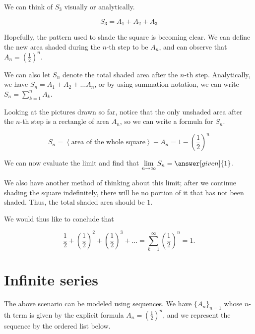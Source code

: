 \documentclass{ximera}
\begin{document}
\begin{example}
We can think of $S_3$ visually or analytically. 

\[
S_3 = A_1 + A_2 + A_3
\]



\vspace{3mm}



Hopefully, the pattern used to shade the square is becoming clear.  We can define the new area shaded during the $n$-th step to be $A_n$, and can observe that $A_n = \left( \frac{1}{2} \right)^n$.

We can also let $S_n$ denote the total shaded area after the $n$-th step.  Analytically, we have $S_n = A_1+A_2 + \ldots A_n$, or by using summation notation, we can write $\displaystyle S_n = \sum_{k=1}^n A_k$.

Looking at the pictures drawn so far, notice that the only unshaded area after the $n$-th step is a rectangle of area $A_n$, so we can write a formula for $S_n$.   

\[
S_n = \left<\textrm{area of the whole square}\right>-A_n = 1-\left(\frac{1}{2}\right)^n
\]

We can now evaluate the limit and find that $\lim\limits_{n \to \infty} S_n =\answer[given]{1}$.

We also have another method of thinking about this limit; after we continue shading the square indefinitely, there will be no portion of it that has not been shaded.  Thus, the total shaded area should be $1$.

We would thus like to conclude that

\[
\frac{1}{2} + \left(\frac{1}{2}\right)^2+ \left(\frac{1}{2}\right)^3+ \ldots = \sum\limits_{k=1}^{\infty} \left(\frac{1}{2}\right)^n =1.
\]
\end{example}

















\section*{Infinite series}
The above scenario can be modeled using sequences.  We have $\{A_n\}_{n=1}$ whose $n$-th term is given by the explicit formula $A_n=\left(\frac{1}{2}\right)^n$, and we represent the sequence by the ordered list below.
\end{document}
